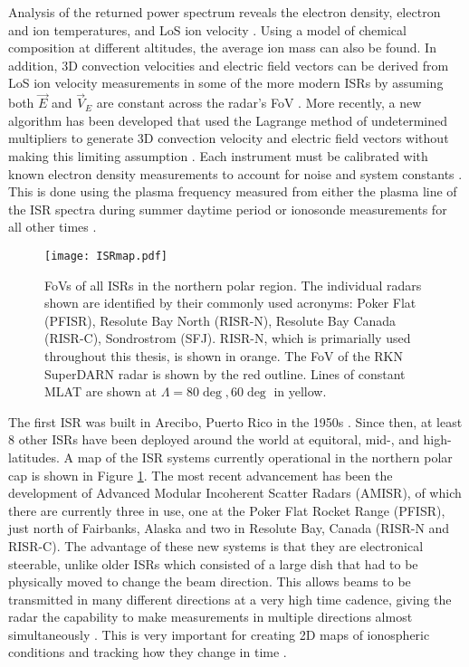 Analysis of the returned power spectrum reveals the electron density, electron and ion temperatures, and LoS ion velocity \citep{Evans1969,Rishbeth1985,Nicolls2007a}.  Using a model of chemical composition at different altitudes, the average ion mass can also be found.  In addition, 3D convection velocities and electric field vectors can be derived from LoS ion velocity measurements in some of the more modern ISRs by assuming both \(\vec{E}\) and \(\vec{V}_E\) are constant across the radar's FoV \citep{Heinselman2008}.  More recently, a new algorithm has been developed that used the Lagrange method of undetermined multipliers to generate 3D convection velocity and electric field vectors without making this limiting assumption \citep{Nicolls2014}.  Each instrument must be calibrated with known electron density measurements to account for noise and system constants \citep{Nicolls2007a}.  This is done using the plasma frequency measured from either the plasma line of the ISR spectra during summer daytime period or ionosonde measurements for all other times \citep{Bahcivan2010,Themens2014}.

\begin{figure}
	\texttt{[image: ISRmap.pdf]}
	\caption{FoVs of all ISRs in the northern polar region.  The individual radars shown are identified by their commonly used acronyms: Poker Flat (PFISR), Resolute Bay North (RISR-N), Resolute Bay Canada (RISR-C), Sondrostrom (SFJ).  RISR-N, which is primarially used throughout this thesis, is shown in orange.  The FoV of the RKN SuperDARN radar is shown by the red outline.  Lines of constant MLAT are shown at \(\Lambda=80\deg,60\deg\) in yellow.}
	\label{fig:isrmap}
\end{figure}

The first ISR was built in Arecibo, Puerto Rico in the 1950s \citep{Gordon1958}.  Since then, at least 8 other ISRs have been deployed around the world at equitoral, mid-, and high-latitudes.  A map of the ISR systems currently operational in the northern polar cap is shown in Figure \ref{fig:isrmap}.  The most recent advancement has been the development of Advanced Modular Incoherent Scatter Radars (AMISR), of which there are currently three in use, one at the Poker Flat Rocket Range (PFISR), just north of Fairbanks, Alaska and two in Resolute Bay, Canada (RISR-N and RISR-C).  The advantage of these new systems is that they are electronical steerable, unlike older ISRs which consisted of a large dish that had to be physically moved to change the beam direction.  This allows beams to be transmitted in many different directions at a very high time cadence, giving the radar the capability to make measurements in multiple directions almost simultaneously \citep{Nicolls2007a,Nicolls2007b,Bahcivan2010}.  This is very important for creating 2D maps of ionospheric conditions and tracking how they change in time \citep{Semeter2009,Dahlgren2012a,Dahlgren2012b}.

